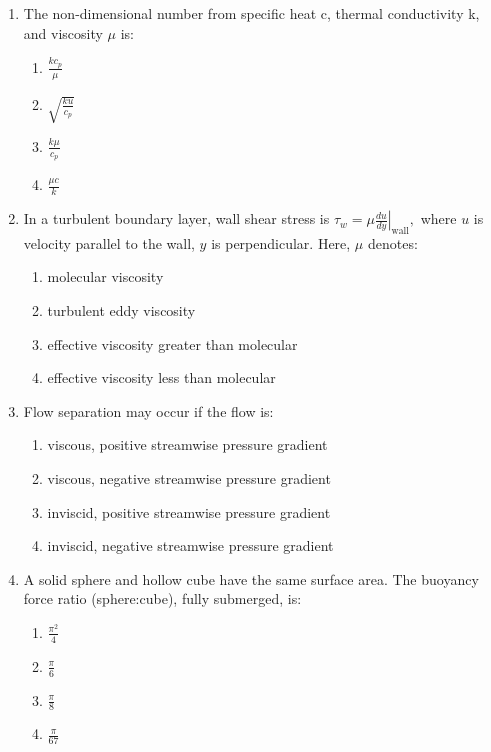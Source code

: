 \documentclass[journal,cmex10]{IEEEtran}
\theoremstyle{remark}
\numberwithin{equation}{enumi}
\numberwithin{figure}{enumi}
\begin{document}
\begin{enumerate}[label=\arabic*)]
\vspace{0.5cm}
\item The non-dimensional number from specific heat c, thermal conductivity k, and viscosity $\mu$ is:  
\hfill{}
\begin{enumerate}[label=\alph*)]
    \item $\frac{k c_p}{\mu}$
    \item $\sqrt{\frac{k u}{c_p}}$
    \item $\frac{k \mu}{c_p}$
    \item $\frac{\mu c}{k}$
\end{enumerate}

\newpage

\vspace{0.5cm}
\item In a turbulent boundary layer, wall shear stress is  
$\tau_w = \mu \left.\frac{du}{dy}\right|_{\text{wall}}, $  
where $u$ is velocity parallel to the wall, $y$ is perpendicular. Here, $\mu$ denotes: 
\bigskip
\hfill {}
\begin{enumerate}[label=\alph*)]
    \item molecular viscosity
    \item turbulent eddy viscosity
    \item effective viscosity greater than molecular
    \item effective viscosity less than molecular
\end{enumerate}

\vspace{0.5cm}
\item Flow separation may occur if the flow is:
\bigskip
\hfill {}
\begin{enumerate}[label=\alph*)]
    \item viscous, positive streamwise pressure gradient
    \item viscous, negative streamwise pressure gradient
    \item inviscid, positive streamwise pressure gradient
    \item inviscid, negative streamwise pressure gradient
\end{enumerate}

\vspace{0.5cm}
\item A solid sphere and hollow cube have the same surface area. The buoyancy force ratio (sphere:cube), fully submerged, is:  
\hfill {}
\begin{enumerate}[label=\alph*)]
    \item $\frac{\pi^2}{4}$
    \vspace{0.1cm}
    \item $\frac{\pi}{6}$
    \vspace{0.1cm}
    \item $\frac{\pi}{8}$
    \vspace{0.1cm}
    \item $\frac{\pi}{67}$
\end{enumerate}


\end{enumerate}
\end{document}
